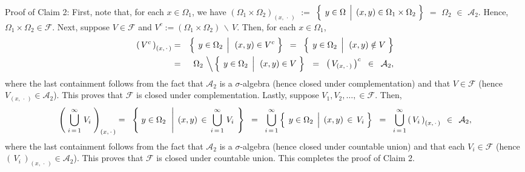 \vskip 0.5cm
\noindent
Proof of Claim 2:\quad
First, note that, for each $x \in \Omega_{1}$, we have
$(\Omega_{1}\times\Omega_{2})_{(x,\,\cdot\,)}$ $:=$
$\left\{\;\left. y\overset{{\color{white}.}}{\in}\Omega \;\,\right\vert\; (x,y)\in\Omega_{1}\times\Omega_{2}\;\right\}$
$=$ $\Omega_{2}$ $\in$ $\mathcal{A}_{2}$.
Hence, $\Omega_{1}\times\Omega_{2} \in \mathcal{F}$.
Next, suppose $V \in \mathcal{F}$ and $V^{c} := (\Omega_{1}\times\Omega_{2})\,\backslash\,V$.
Then, for each $x \in \Omega_{1}$,
\begin{eqnarray*}
\left(\,V^{c}\,\right)_{(x,\,\cdot\,)}
& = &
	\left\{\;\left.
	y \overset{{\color{white}.}}{\in} \Omega_{2}
	\,\;\right\vert\,\;
	(x,y) \in V^{c}
	\;\right\}
\;\; = \;\;
	\left\{\;\left.
	y \overset{{\color{white}.}}{\in} \Omega_{2}
	\,\;\right\vert\,\;
	(x,y) \notin V
	\;\right\}
\\
& = &
	\Omega_{2}
	\,\left\backslash\,
	\left\{\;\left.
	y \overset{{\color{white}.}}{\in} \Omega_{2}
	\,\;\right\vert\,\;
	(x,y) \in V
	\;\right\}
	\right.
\;\; = \;\;
	\left(\,V_{(x,\,\cdot\,)}\,\right)^{c}
\;\; \in \;\; \mathcal{A}_{2},
\end{eqnarray*}
where the last containment follows from the fact that $\mathcal{A}_{2}$ is a $\sigma$-algebra (hence closed under complementation) and that $V \in \mathcal{F}$ (hence $V_{(x,\,\cdot\,)} \in \mathcal{A}_{2}$). This proves that $\mathcal{F}$ is closed under complementation. Lastly, suppose $V_{1}, V_{2}, \ldots, \in \mathcal{F}$. Then,
\begin{eqnarray*}
\left(\;\overset{\infty}{\underset{i\,=\,1}{\bigcup}}\;V_{i}\;\right)_{(x,\,\cdot\,)}
=\;\;
	\left\{\;
	y \overset{{\color{white}.}}{\in} \Omega_{2}
	\,\;\left\vert\,\;
	(x,y) \,\in\, \overset{\infty}{\underset{i\,=\,1}{\bigcup}}\;V_{i}
	\right.
	\;\right\}
\;\; = \;\;
	\overset{\infty}{\underset{i\,=\,1}{\bigcup}}
	\left\{\;\left.
	y \overset{{\color{white}.}}{\in} \Omega_{2}
	\,\;\right\vert\;
	(x,y) \,\in\, V_{i}
	\;\right\}
\;\; = \;\;
	\overset{\infty}{\underset{i\,=\,1}{\bigcup}}
	\left(\,V_{i}\,\right)_{(x,\,\cdot\,)}
\;\, \in \;\, \mathcal{A}_{2},
\end{eqnarray*}
where the last containment follows from the fact that $\mathcal{A}_{2}$ is a $\sigma$-algebra (hence closed under countable union) and that each $V_{i} \in \mathcal{F}$ (hence $\left(\,V_{i}\,\right)_{(x,\,\cdot\,)} \in \mathcal{A}_{2}$).
This proves that $\mathcal{F}$ is closed under countable union. This completes the proof of Claim 2.

